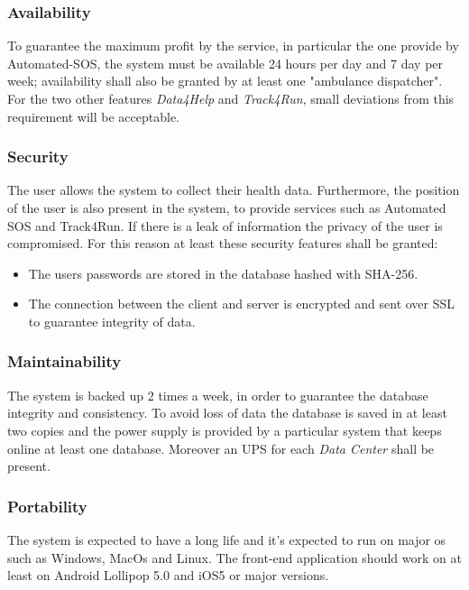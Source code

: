 \documentclass[a4paper]{article}
\begin{document}
        \subsubsection{Availability}
        To guarantee the maximum profit by the service, in particular the one provide by Automated-SOS, the system must be available 24 hours per day and 7 day per week; availability shall also be granted by at least one "ambulance dispatcher". For the two other features \textit{Data4Help} and \textit{Track4Run}, small deviations from this requirement will be acceptable.
        
        \subsubsection{Security}
        The user allows the system to collect their health data. Furthermore, the position of the user is also present in the system, to provide services such as Automated SOS and Track4Run. If there is a leak of information the privacy of the user is compromised. For this reason at least these security features shall be granted:
       
        \begin{itemize}
        \item The users passwords are stored in the database hashed with SHA-256.
        \item The connection between the client and server is encrypted and sent over SSL to guarantee integrity of data. 
        \end{itemize}
        \subsubsection{Maintainability}

        The system is backed up 2 times a  week, in order to guarantee the database integrity and consistency. To avoid loss of data  the database is saved in at least two copies and the power supply is provided by a particular system that keeps online at least one database. Moreover an UPS for each \textit{Data Center} shall be present.
        \subsubsection{Portability}
        The system is expected to have a long life and it's expected to run on major os such as Windows, MacOs and Linux.
        The front-end application should work on at least on Android Lollipop 5.0 and iOS5 or major versions.
\end{document}
